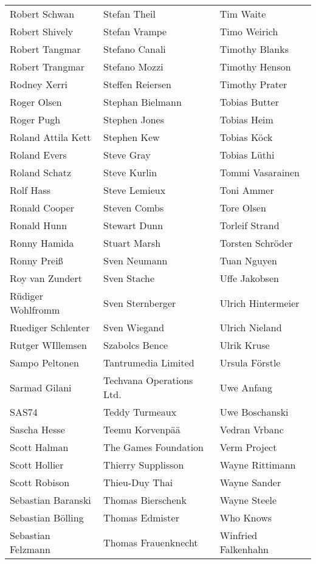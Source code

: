 \begin{small}
\begin{tabular}{p{4cm}p{4cm}p{4cm}}
Robert Schwan & Stefan Theil & Tim Waite \\
Robert Shively & Stefan Vrampe & Timo Weirich \\
Robert Tangmar & Stefano Canali & Timothy Blanks \\
Robert Trangmar & Stefano Mozzi & Timothy Henson \\
Rodney Xerri & Steffen Reiersen & Timothy Prater \\
Roger Olsen & Stephan Bielmann & Tobias Butter \\
Roger Pugh & Stephen Jones & Tobias Heim \\
Roland Attila Kett & Stephen Kew & Tobias Köck \\
Roland Evers & Steve Gray & Tobias Lüthi \\
Roland Schatz & Steve Kurlin & Tommi Vasarainen \\
Rolf Hass & Steve Lemieux & Toni Ammer \\
Ronald Cooper & Steven Combs & Tore Olsen \\
Ronald Hunn & Stewart Dunn & Torleif Strand \\
Ronny Hamida & Stuart Marsh & Torsten Schröder \\
Ronny Preiß & Sven Neumann & Tuan Nguyen \\
Roy van Zundert & Sven Stache & Uffe Jakobsen \\
Rüdiger Wohlfromm & Sven Sternberger & Ulrich Hintermeier \\
Ruediger Schlenter & Sven Wiegand & Ulrich Nieland \\
Rutger WIllemsen & Szabolcs Bence & Ulrik Kruse \\
Sampo Peltonen & Tantrumedia Limited & Ursula Förstle \\
Sarmad Gilani & Techvana Operations Ltd. & Uwe Anfang \\
SAS74 & Teddy Turmeaux & Uwe Boschanski \\
Sascha Hesse & Teemu Korvenpää & Vedran Vrbanc \\
Scott Halman & The Games Foundation & Verm Project \\
Scott Hollier & Thierry Supplisson & Wayne Rittimann \\
Scott Robison & Thieu-Duy Thai & Wayne Sander \\
Sebastian Baranski & Thomas Bierschenk & Wayne Steele \\
Sebastian Bölling & Thomas Edmister & Who Knows \\
Sebastian Felzmann & Thomas Frauenknecht & Winfried Falkenhahn \\

\end{tabular}
\end{small}
